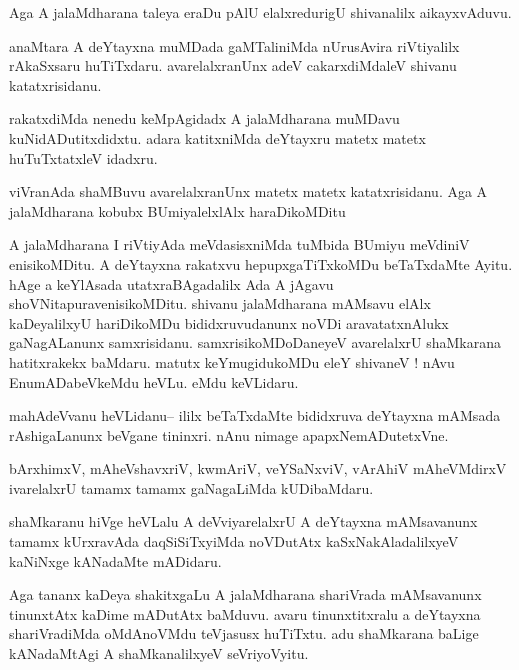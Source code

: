 \documentclass{article}
\begin{document}
\begin{mn}%
Aga A jalaMdharana taleya eraDu pAlU elalxredurigU shivanalilx aikayxvAduvu.
\end{mn}

\begin{mn}%
anaMtara A deYtayxna muMDada gaMTaliniMda nUrusAvira riVtiyalilx rAkaSxsaru huTiTxdaru. 
avarelalxranUnx adeV cakarxdiMdaleV shivanu katatxrisidanu.
\end{mn}

\begin{mn}%
rakatxdiMda nenedu keMpAgidadx A jalaMdharana muMDavu kuNidADutitxdidxtu. adara katitxniMda 
deYtayxru matetx matetx huTuTxtatxleV idadxru.
\end{mn}

\begin{mn}%
viVranAda shaMBuvu avarelalxranUnx matetx matetx katatxrisidanu. Aga A jalaMdharana kobubx 
BUmiyalelxlAlx haraDikoMDitu
\end{mn}

\begin{mn}%
A jalaMdharana I riVtiyAda meVdasisxniMda tuMbida BUmiyu meVdiniV enisikoMDitu. A deYtayxna 
rakatxvu hepupxgaTiTxkoMDu beTaTxdaMte Ayitu. hAge a keYlAsada utatxraBAgadalilx Ada A 
jAgavu shoVNitapuravenisikoMDitu. shivanu jalaMdharana mAMsavu elAlx kaDeyalilxyU 
hariDikoMDu bididxruvudanunx noVDi aravatatxnAlukx gaNagALanunx samxrisidanu. 
samxrisikoMDoDaneyeV avarelalxrU shaMkarana hatitxrakekx baMdaru. matutx keYmugidukoMDu 
eleY shivaneV ! nAvu EnumADabeVkeMdu heVLu. eMdu keVLidaru.
\end{mn}

\begin{mn}%
mahAdeVvanu heVLidanu-- ililx beTaTxdaMte bididxruva deYtayxna mAMsada rAshigaLanunx beVgane 
tininxri. nAnu nimage apapxNemADutetxVne.
\end{mn}

\begin{mn}%
bArxhimxV, mAheVshavxriV, kwmAriV, veYSaNxviV, vArAhiV mAheVMdirxV ivarelalxrU tamamx tamamx 
gaNagaLiMda kUDibaMdaru.
\end{mn}

\begin{mn}%
shaMkaranu hiVge heVLalu A deVviyarelalxrU A deYtayxna mAMsavanunx tamamx kUrxravAda 
daqSiSiTxyiMda  noVDutAtx kaSxNakAladalilxyeV kaNiNxge kANadaMte mADidaru.
\end{mn}

\begin{mn}%
Aga tananx kaDeya shakitxgaLu A jalaMdharana shariVrada mAMsavanunx tinunxtAtx kaDime 
mADutAtx baMduvu. avaru tinunxtitxralu a deYtayxna shariVradiMda oMdAnoVMdu teVjasusx 
huTiTxtu. adu shaMkarana baLige kANadaMtAgi A shaMkanalilxyeV seVriyoVyitu.
\end{mn}
\end{document}
